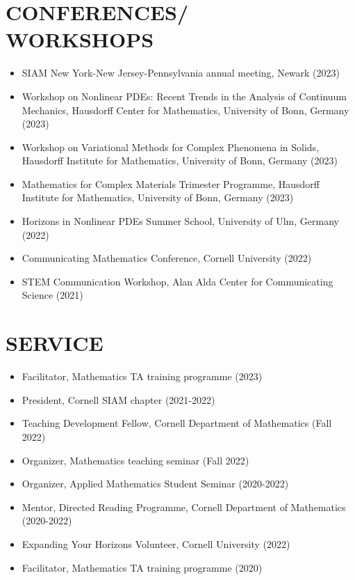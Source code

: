 \documentclass[margin]{res} %
\begin{document}
\begin{resume}
\section{CONFERENCES/\\WORKSHOPS}
\begin{itemize}
	\item SIAM New York-New Jersey-Pennsylvania annual meeting, Newark (2023)
	\item Workshop on Nonlinear PDEs: Recent Trends in the Analysis of Continuum Mechanics, Hausdorff Center for Mathematics, University of Bonn, Germany (2023)
	\item Workshop on Variational Methods for Complex Phenomena in Solids, Hausdorff Institute for Mathematics, University of Bonn, Germany (2023)
	\item Mathematics for Complex Materials Trimester Programme, Hausdorff Institute for Mathematics, University of Bonn, Germany (2023)
	\item Horizons in Nonlinear PDEs Summer School, University of Ulm, Germany (2022)
	\item Communicating Mathematics Conference, Cornell University (2022)
	\item STEM Communication Workshop, Alan Alda Center for Communicating Science (2021)
\end{itemize}

\section{SERVICE}
\begin{itemize}
	\item Facilitator, Mathematics TA training programme (2023)
	\item President, Cornell SIAM chapter (2021-2022)
	\item Teaching Development Fellow, Cornell Department of Mathematics (Fall 2022)
	\item Organizer, Mathematics teaching seminar (Fall 2022)
	\item Organizer, Applied Mathematics Student Seminar (2020-2022)
	\item Mentor, Directed Reading Programme, Cornell Department of Mathematics (2020-2022)
	\item Expanding Your Horizons Volunteer, Cornell University (2022)
	\item Facilitator, Mathematics TA training programme (2020)
\end{itemize}


\end{resume}
\end{document}

